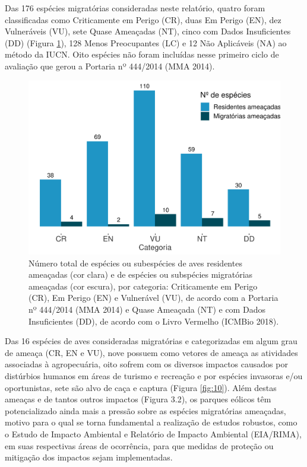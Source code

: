 \documentclass[
  oneside]{scrbook}
\begin{document}
Das 176 espécies migratórias consideradas neste relatório, quatro foram classificadas como Criticamente em Perigo (CR), duas Em Perigo (EN), dez Vulneráveis (VU), sete Quase Ameaçadas (NT), cinco com Dados Insuficientes (DD) (Figura \ref{fig:09}), 128 Menos Preocupantes (LC) e 12 Não Aplicáveis (NA) ao método da IUCN. Oito espécies não foram incluídas nesse primeiro ciclo de avaliação que gerou a Portaria nº 444/2014 (MMA 2014).

\begin{figure}[H]

{\centering \includegraphics[width=0.65\linewidth]{04-cap03_files/figure-latex/09-1} 

}

\caption{Número total de espécies ou subespécies de aves residentes ameaçadas (cor clara) e de espécies ou subspécies migratórias ameaçadas (cor escura), por categoria: Criticamente em Perigo (CR), Em Perigo (EN) e Vulnerável (VU), de acordo com a Portaria nº 444/2014 (MMA 2014) e Quase Ameaçada (NT) e com Dados Insuficientes (DD), de acordo com o Livro Vermelho (ICMBio 2018).}\label{fig:09}
\end{figure}

Das 16 espécies de aves consideradas migratórias e categorizadas em algum grau de ameaça (CR, EN e VU), nove possuem como vetores de ameaça as atividades associadas à agropecuária, oito sofrem com os diversos impactos causados por distúrbios humanos em áreas de turismo e recreação e por espécies invasoras e/ou oportunistas, sete são alvo de caça e captura (Figura \ref{fig:10}). Além destas ameaças e de tantos outros impactos (Figura 3.2), os parques eólicos têm potencializado ainda mais a pressão sobre as espécies migratórias ameaçadas, motivo para o qual se torna fundamental a realização de estudos robustos, como o Estudo de Impacto Ambiental e Relatório de Impacto Ambiental (EIA/RIMA), em suas respectivas áreas de ocorrência, para que medidas de proteção ou mitigação dos impactos sejam implementadas.
\end{document}
